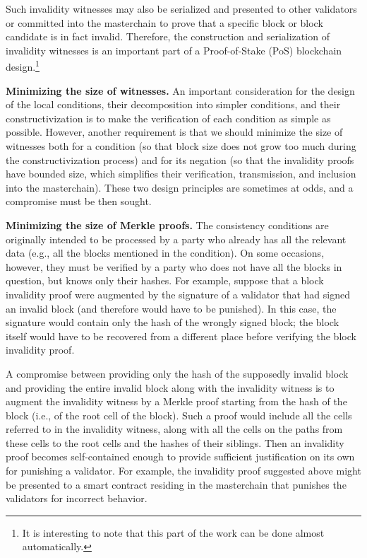 \documentclass[12pt,oneside]{article}
\def\makepoint#1{\medbreak\noindent{\bf #1.\ }}
\def\nxsubpoint{\refstepcounter{subsubsection}%
  \smallbreak\makepoint{\thesubsubsection}}
\def\emb#1{\textbf{#1.}}
\begin{document}
Such invalidity witnesses may also be serialized and presented to other validators or committed into the masterchain to prove that a specific block or block candidate is in fact invalid. Therefore, the construction and serialization of invalidity witnesses is an important part of a Proof-of-Stake (PoS) blockchain design.\footnote{It is interesting to note that this part of the work can be done almost automatically.}

\nxsubpoint\emb{Minimizing the size of witnesses}
An important consideration for the design of the local conditions, their decomposition into simpler conditions, and their constructivization is to make the verification of each condition as simple as possible. However, another requirement is that we should minimize the size of witnesses both for a condition (so that block size does not grow too much during the constructivization process) and for its negation (so that the invalidity proofs have bounded size, which simplifies their verification, transmission, and inclusion into the masterchain). These two design principles are sometimes at odds, and a compromise must be then sought.

\nxsubpoint\emb{Minimizing the size of Merkle proofs}
The consistency conditions are originally intended to be processed by a party who already has all the relevant data (e.g., all the blocks mentioned in the condition). On some occasions, however, they must be verified by a party who does not have all the blocks in question, but knows only their hashes. For example, suppose that a block invalidity proof were augmented by the signature of a validator that had signed an invalid block (and therefore would have to be punished). In this case, the signature would contain only the hash of the wrongly signed block; the block itself would have to be recovered from a different place before verifying the block invalidity proof.

A compromise between providing only the hash of the supposedly invalid block and providing the entire invalid block along with the invalidity witness is to augment the invalidity witness by a Merkle proof starting from the hash of the block (i.e., of the root cell of the block). Such a proof would include all the cells referred to in the invalidity witness, along with all the cells on the paths from these cells to the root cells and the hashes of their siblings. Then an invalidity proof becomes self-contained enough to provide sufficient justification on its own for punishing a validator. For example, the invalidity proof suggested above might be presented to a smart contract residing in the masterchain that punishes the validators for incorrect behavior.
\end{document}
